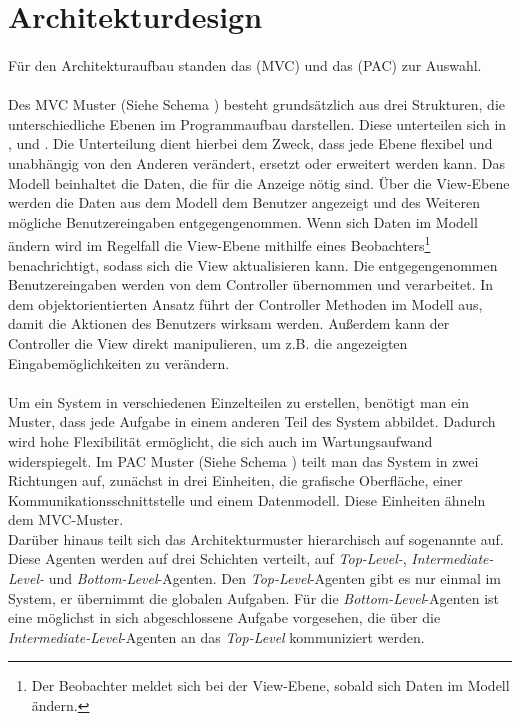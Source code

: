 \section{Architekturdesign}
\paragraph{}
Für den Architekturaufbau standen das  (MVC) und das  (PAC) zur Auswahl.
\paragraph{}
Des MVC Muster (Siehe Schema ) besteht grundsätzlich aus drei Strukturen, die unterschiedliche Ebenen im Programmaufbau darstellen.
Diese unterteilen sich in ,  und . Die Unterteilung dient hierbei dem Zweck, dass jede Ebene flexibel und unabhängig von den Anderen verändert, ersetzt oder erweitert werden kann. 
Das Modell beinhaltet die Daten, die für die Anzeige nötig sind. Über die View-Ebene werden die Daten aus dem Modell dem Benutzer angezeigt und des Weiteren mögliche Benutzereingaben entgegengenommen. Wenn sich Daten im Modell ändern wird im Regelfall die View-Ebene mithilfe eines Beobachters\footnote{Der Beobachter meldet sich bei der View-Ebene, sobald sich Daten im Modell ändern.} benachrichtigt, sodass sich die View aktualisieren kann. Die entgegengenommen Benutzereingaben werden von dem Controller übernommen und verarbeitet. In dem objektorientierten Ansatz führt der Controller Methoden im Modell aus, damit die Aktionen des Benutzers wirksam werden. Außerdem kann der Controller die View direkt manipulieren, um z.B. die angezeigten Eingabemöglichkeiten zu verändern. 
\paragraph{}
Um ein System in verschiedenen Einzelteilen zu erstellen, benötigt man ein Muster, dass jede Aufgabe in einem anderen Teil des System abbildet. Dadurch wird hohe Flexibilität ermöglicht, die sich auch im Wartungsaufwand widerspiegelt.
Im PAC Muster (Siehe Schema ) teilt man das System in zwei Richtungen auf, zunächst in drei Einheiten, die grafische Oberfläche, einer Kommunikationsschnittstelle und einem Datenmodell. Diese Einheiten ähneln dem MVC-Muster.\\
Darüber hinaus teilt sich das Architekturmuster hierarchisch auf sogenannte  auf.
Diese Agenten werden auf drei Schichten verteilt, auf \textit{Top-Level-}, \textit{Intermediate-Level-} und \textit{Bottom-Level}-Agenten. Den \textit{Top-Level}-Agenten gibt es nur einmal im System, er übernimmt die globalen Aufgaben. Für die \textit{Bottom-Level}-Agenten ist eine möglichst in sich abgeschlossene Aufgabe vorgesehen, die über die \textit{Intermediate-Level}-Agenten an das \textit{Top-Level} kommuniziert werden.
